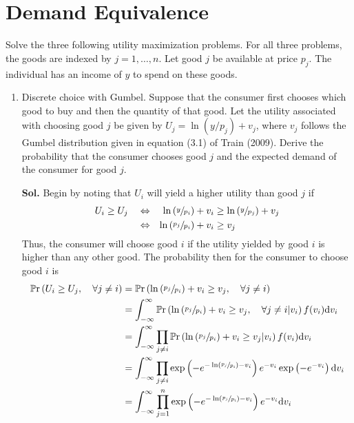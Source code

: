 \documentclass[12pt,oneside,reqno]{amsart}
\newcommand{\pr}{\mathbb{P}\mathrm{r}}
\begin{document}
\section{Demand Equivalence}
Solve the three following utility maximization problems. For all three problems, the goods are indexed by $j=1, \ldots, n$. Let good $j$ be available at price $p_j$. The individual has an income of $y$ to spend on these goods.
\begin{enumerate}[leftmargin=*,label=\textbf{\arabic*.}]
    \item Discrete choice with Gumbel. Suppose that the consumer first chooses which good to buy and then the quantity of that good. Let the utility associated with choosing good $j$ be given by $U_j=\ln \left(y / p_j\right)+v_j$, where $v_j$ follows the Gumbel distribution given in equation (3.1) of Train (2009). Derive the probability that the consumer chooses good $j$ and the expected demand of the consumer for good $j$.
    \item[\textbf{Sol.}] Begin by noting that $U_i$ will yield a higher  utility than good $j$ if 
    \begin{align*}
        U_i &\geq U_j & &\Leftrightarrow & \ln\left(\sfrac{y}{p_i}\right) + v_i &\geq \ln\left(\sfrac{y}{p_j}\right) + v_j \\ 
        & & &\Leftrightarrow & \ln\left(\sfrac{p_j}{p_i}\right) + v_i &\geq v_j
    \end{align*}
    Thus, the consumer will choose good $i$ if the utility yielded by good $i$ is higher than any other good. The probability then for the consumer to choose good $i$ is 
    \begin{align*}
        \pr\left(U_i\geq U_j,\quad \forall j\neq i\right)&= \pr\left(\ln\left(\sfrac{p_j}{p_i}\right)+v_i \geq v_j,\quad\forall j\neq i\right) \\ 
        &= \int_{-\infty}^\infty \pr\left(\ln\left(\sfrac{p_j}{p_i}\right)+v_i \geq v_j,\quad\forall j\neq i\vert  v_i \right)f(v_i)\mathrm{d}v_i \\ 
        &= \int_{-\infty}^\infty \prod_{j\neq i}\pr\left(\ln\left(\sfrac{p_j}{p_i}\right)+v_i \geq v_j\vert  v_i \right)f(v_i)\mathrm{d}v_i \\ 
        &= \int_{-\infty}^\infty \prod_{j\neq i}\exp\left(-e^{-\ln\left(\sfrac{p_j}{p_i}\right)-v_i}\right)e^{-v_i}\exp\left(-e^{-v_i}\right)\mathrm{d}v_i \\ 
        &= \int_{-\infty}^\infty \prod_{j=1}^n\exp\left(-e^{-\ln\left(\sfrac{p_j}{p_i}\right)-v_i}\right)e^{-v_i}\mathrm{d}v_i \\ 

\end{align*}
\end{enumerate}
\end{document}
